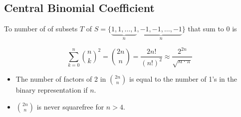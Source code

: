 \subsection{Central Binomial Coefficient}

To number of of subsets $T$ of $S = \{ \underbrace{1, 1, \dots, 1}_{n}, \underbrace{-1, -1, \dots, -1}_{n} \}$ that sum to 0 is

$$ \sum_{k=0}^n \binom{n}{k}^2 = \binom{2n}{n} = \frac{2n!}{\left(n!\right)^2} \approx \frac{2^{2n}}{\sqrt{n \cdot \pi}} $$

\begin{itemize}
    \item  The number of factors of 2 in $\binom{2n}{n}$ is equal to the number of 1's in the binary representation if $n$.

    \item $\binom{2n}{n}$ is never squarefree for $n > 4$.
\end{itemize}
